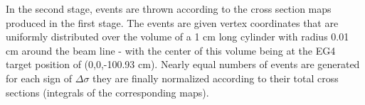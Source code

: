 
In the second stage, events are thrown %
according to the cross section maps produced in the first stage. %
The events are given vertex coordinates that are uniformly distributed over the volume of a 1 cm long cylinder with radius 0.01 cm around the beam line - with the center of this volume being at the EG4 target position of (0,0,-100.93 cm). Nearly equal numbers of events are generated for each %
 sign of $\Delta \sigma$ they are finally normalized according to their total cross sections (integrals %
of the corresponding maps). %



